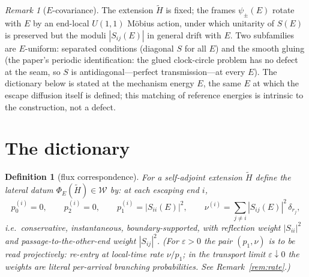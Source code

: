 \documentclass[11pt]{article}
\newtheorem{definition}[theorem]{Definition}
\theoremstyle{remark}
\newtheorem{remark}[theorem]{Remark}
\begin{document}
\begin{remark}[$E$-covariance]\label{rem:Ecov}
The extension $\tilde H$ is fixed; the frames $\psi_\pm(E)$ rotate with
$E$ by an end-local $U(1,1)$ M\"obius action, under which unitarity of
$S(E)$ is preserved but the moduli $|S_{ij}(E)|$ in general drift with
$E$.  Two subfamilies are $E$-uniform: separated conditions (diagonal
$S$ for all $E$) and the smooth gluing (the paper's periodic
identification: the glued clock-circle problem has no defect at the
seam, so $S$ is antidiagonal---perfect transmission---at every $E$).
The dictionary below is stated at the mechanism energy $E$, the same
$E$ at which the escape diffusion itself is defined; this matching of
reference energies is intrinsic to the construction, not a defect.
\end{remark}

\section{The dictionary}

\begin{definition}[flux correspondence]\label{def:phi}
For a self-adjoint extension $\tilde H$ define the lateral datum
$\Phi_E(\tilde H)\in\mathcal W$ by: at each escaping end $i$,
\[
p_0^{(i)}=0,\qquad p_2^{(i)}=0,\qquad
p_1^{(i)}=|S_{ii}(E)|^2,\qquad
\nu^{(i)}=\sum_{j\ne i}|S_{ij}(E)|^2\,\delta_{r_j},
\]
i.e.\ conservative, instantaneous, boundary-supported, with reflection
weight $|S_{ii}|^2$ and passage-to-the-other-end weight $|S_{ij}|^2$.
(For $\varepsilon>0$ the pair $(p_1,\nu)$ is to be read projectively:
re-entry at local-time rate $\nu/p_1$; in the transport limit
$\varepsilon\downarrow0$ the weights are literal per-arrival branching
probabilities.  See Remark~\ref{rem:rate}.)
\end{definition}
\end{document}
